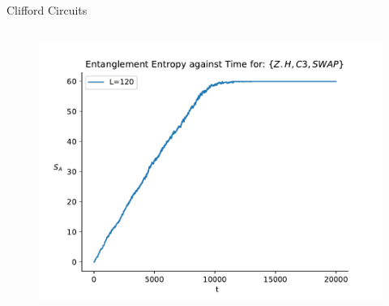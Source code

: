 \begin{frame}{Clifford Circuits}
\begin{columns}
        \begin{column}{0.475\textwidth}
            \begin{figure}
                \vspace{-3cm}
                \includegraphics[width = \textwidth]{QS_Images/BAL_reconstruction.pdf}
            \end{figure}
        \end{column}

    \end{columns}

\end{frame}

